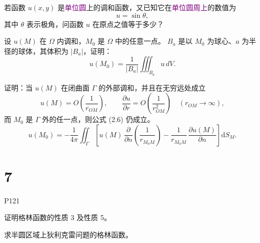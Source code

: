 \begin{homework}[2]
若函数 $u(x,y)$ 是\textcolor{purple}{单位圆}上的调和函数，又已知它在\textcolor{purple}{单位圆周上}的数值为
\[
u = \sin\theta,
\]
其中 $\theta$ 表示极角，问函数 $u$ 在原点之值等于多少？
\end{homework}


\begin{homework}[3]
设 $u(M)$ 在 $\Omega$ 内调和，$M_0$ 是 $\Omega$ 中的任意一点。
$B_a$ 是以 $M_0$ 为球心、$a$ 为半径的球体，其体积为 $|B_a|$，证明：
\[
u(M_0)=\frac{1}{|B_a|}\iiint_{B_a} u\,dV.
\]
\end{homework}




\begin{homework}[4]
证明：当 $u(M)$ 在闭曲面 $\Gamma$ 的外部调和，并且在无穷远处成立
\[
u(M)=O\!\left(\frac{1}{r_{OM}}\right),\qquad
\frac{\partial u}{\partial r}=O\!\left(\frac{1}{r_{OM}^2}\right)
\quad (r_{OM}\to\infty),
\]
而 $M_0$ 是 $\Gamma$ 外的任一点，则公式 (2.6) 仍成立。
\begin{equation}\tag{2.6}\label{eq:2.6}
u(M_0)
= -\frac{1}{4\pi}
  \iint_{\Gamma}
  \left[
    u(M)\,\frac{\partial}{\partial n}
      \!\left(\frac{1}{r_{M_0M}}\right)
    - \frac{1}{r_{M_0M}}\,
      \frac{\partial u(M)}{\partial n}
  \right]\mathrm dS_M .
\end{equation}
\end{homework}



\section{7}
P121
\begin{homework}[1]
证明格林函数的性质 3 及性质 5。
\end{homework}

\begin{homework}[5]
求半圆区域上狄利克雷问题的格林函数。
\end{homework}